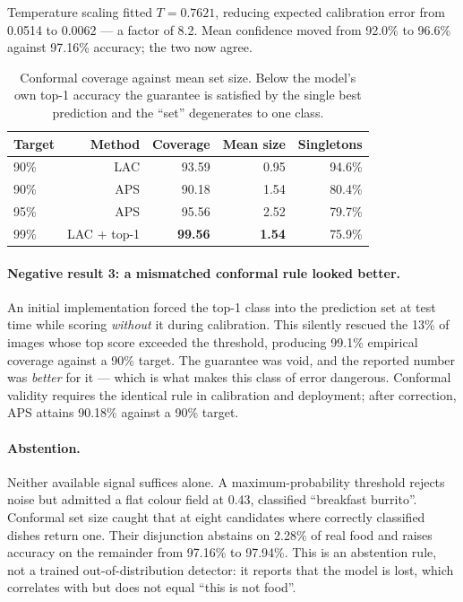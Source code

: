 \documentclass[11pt,a4paper,twoside]{article}
\newcommand{\num}[1]{\mbox{#1}}
\begin{document}
Temperature scaling fitted $T = \num{0.7621}$, reducing expected calibration error from
\num{0.0514} to \num{0.0062} --- a factor of \num{8.2}. Mean confidence moved from
\num{92.0\%} to \num{96.6\%} against \num{97.16\%} accuracy; the two now agree.

\begin{table}[htbp]
\centering\small
\caption{Conformal coverage against mean set size. Below the model's own top-1 accuracy the
guarantee is satisfied by the single best prediction and the ``set'' degenerates to one
class.}
\begin{tabular}{lrrrr}
\toprule
\textbf{Target} & \textbf{Method} & \textbf{Coverage} & \textbf{Mean size} & \textbf{Singletons} \\
\midrule
\num{90\%} & LAC       & \num{93.59} & \num{0.95} & \num{94.6\%} \\
\num{90\%} & APS       & \num{90.18} & \num{1.54} & \num{80.4\%} \\
\num{95\%} & APS       & \num{95.56} & \num{2.52} & \num{79.7\%} \\
\num{99\%} & LAC + top-1 & \textbf{\num{99.56}} & \textbf{\num{1.54}} & \num{75.9\%} \\
\bottomrule
\end{tabular}
\end{table}

\paragraph{Negative result 3: a mismatched conformal rule looked better.}
An initial implementation forced the top-1 class into the prediction set at test time while
scoring \emph{without} it during calibration. This silently rescued the \num{13\%} of images
whose top score exceeded the threshold, producing \num{99.1\%} empirical coverage against a
\num{90\%} target. The guarantee was void, and the reported number was \emph{better} for it
--- which is what makes this class of error dangerous. Conformal validity requires the
identical rule in calibration and deployment; after correction, APS attains \num{90.18\%}
against a \num{90\%} target.

\paragraph{Abstention.} Neither available signal suffices alone. A maximum-probability
threshold rejects noise but admitted a flat colour field at \num{0.43}, classified
``breakfast burrito''. Conformal set size caught that at eight candidates where correctly
classified dishes return one. Their disjunction abstains on \num{2.28\%} of real food and
raises accuracy on the remainder from \num{97.16\%} to \num{97.94\%}. This is an abstention
rule, not a trained out-of-distribution detector: it reports that the model is lost, which
correlates with but does not equal ``this is not food''.
\end{document}
